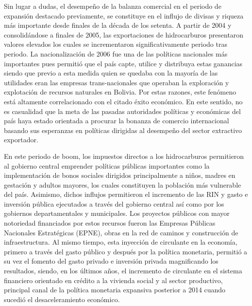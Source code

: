 \documentclass[12pt,letterpaper]{article}
\begin{document}
Sin lugar a dudas, el desempeño de la balanza comercial en el periodo de expansión destacado previamente, se constituye en el influjo de divisas y riqueza más importante desde finales de la década de los setenta. A partir de 2004 y consolidándose a finales de 2005, las exportaciones de hidrocarburos presentaron valores elevados los cuales se incrementaron significativamente periodo tras periodo. La nacionalización de 2006 fue una de las políticas nacionales más importantes pues permitió que el país capte, utilice y distribuya estas ganancias siendo que previo a esta medida quien se quedaba con la mayoría de las utilidades eran las empresas trans-nacionales que operaban la exploración y explotación de recursos naturales en Bolivia. Por estas razones, este fenómeno está altamente correlacionado con el citado éxito económico. En este sentido, no es casualidad que la meta de las pasadas autoridades políticas y económicas del país haya estado orientada a procurar la bonanza de comercio internacional basando sus esperanzas en políticas dirigidas al desempeño del sector extractivo exportador.

En este periodo de boom, los impuestos directos a los hidrocarburos permitieron al gobierno central emprender políticas públicas importantes como la implementación de bonos sociales dirigidos principalmente a niños, madres en gestación y adultos mayores, los cuales constituyen la población más vulnerable del país. Asimismo, dichos influjos permitieron el incremento de las RIN y gasto e inversión pública ejecutados a través del gobierno central así como por los gobiernos departamentales y municipales. Los proyectos públicos con mayor notoriedad financiados por estos recursos fueron las Empresas Públicas Nacionales Estratégicas (EPNE), obras en la red de caminos y construcción de infraestructura. Al mismo tiempo, esta inyección de circulante en la economía, primero a través del gasto público y después por la política monetaria, permitió a su vez el fomento del gasto privado e inversión privada magnificando los resultados, siendo, en los últimos años, el incremento de circulante en el sistema financiero orientado en crédito a la vivienda social y al sector productivo, principal canal de la política monetaria expansiva posterior a 2014 cuando sucedió el desaceleramiento económico. 
\end{document}
